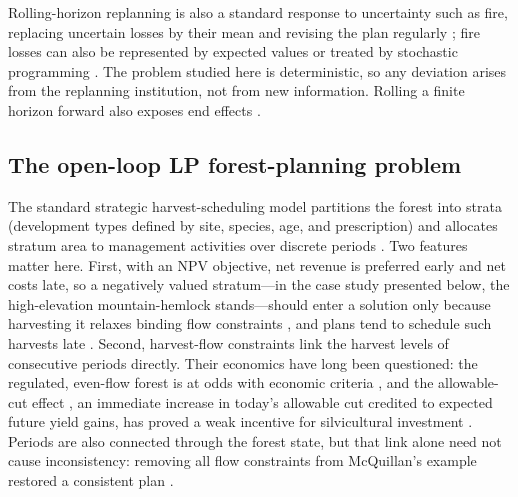 Rolling-horizon replanning is also a standard response to uncertainty such as fire, replacing uncertain losses by their mean and revising the plan regularly \citep[\citealp{gunn1991some}; see][p.~333]{gunn2007models}; fire losses can also be represented by expected values \citep{reed1986optimal} or treated by stochastic programming \citep{gassmann1989optimal,boychuk1996multistage}. The problem studied here is deterministic, so any deviation arises from the replanning institution, not from new information. Rolling a finite horizon forward also exposes end effects \citep{grinold1983model}.

\hypertarget{the-open-loop-lp-forest-planning-problem}{%
\subsection{The open-loop LP forest-planning problem}\label{the-open-loop-lp-forest-planning-problem}}

The standard strategic harvest-scheduling model partitions the forest into strata (development types defined by site, species, age, and prescription) and allocates stratum area to management activities over discrete periods \citep{johnson1977techniques}. Two features matter here. First, with an NPV objective, net revenue is preferred early and net costs late, so a negatively valued stratum---in the case study presented below, the high-elevation mountain-hemlock stands---should enter a solution only because harvesting it relaxes binding flow constraints \citep[pp.~72, 76]{daugherty1991credibility}, and plans tend to schedule such harvests late \citep[p.~332]{gunn2007models}. Second, harvest-flow constraints link the harvest levels of consecutive periods directly. Their economics have long been questioned: the regulated, even-flow forest is at odds with economic criteria \citep{thompson1966traditional}, and the allowable-cut effect \citep{schweitzer1972allowable}, an immediate increase in today's allowable cut credited to expected future yield gains, has proved a weak incentive for silvicultural investment \citep{luckert1995allowable,hegan2000economic}. Periods are also connected through the forest state, but that link alone need not cause inconsistency: removing all flow constraints from McQuillan's example restored a consistent plan \citep[p.~25]{daugherty1991credibility}.

